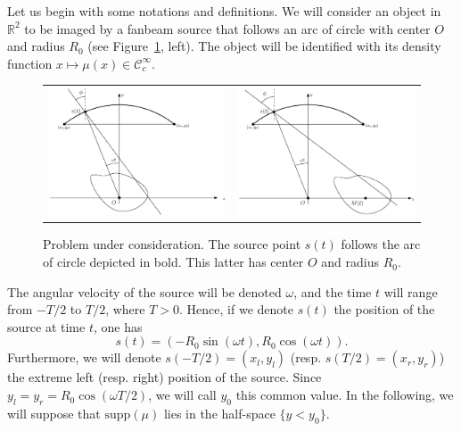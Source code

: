 \documentclass[a4paper]{article}
\numberwithin{equation}{section}
\newcommand{\R}{\mathbb{R}}
\newcommand{\Ccinf}{\mathcal{C}_c^{\infty}}
\newcommand{\supp}{\textrm{supp}}
\begin{document}
Let us begin with some notations and definitions. We will consider an object in $\R^2$ to be imaged by a fanbeam source that follows an arc of circle with center $O$ and radius $R_0$ (see Figure~\ref{fig:notations}, left). The object will be identified with its density function $x \mapsto \mu(x) \in \Ccinf$.
\begin{figure}[!ht]
	\centering
	\begin{tabular}{cc}
	\includegraphics[width=8cm]{figs/frame_scanner_still.eps} &
	\includegraphics[width=8cm]{figs/frame_scanner.eps}
	\end{tabular}
	\caption{Problem under consideration. The source point $s(t)$ follows the arc of circle depicted in bold. This latter has center $O$ and radius $R_0$.\label{fig:notations}}
\end{figure}
The angular velocity of the source will be denoted $\omega$, and the time $t$ will range from $-T/2$ to $T/2$, where $T>0$. Hence, if we denote $s(t)$ the position of the source at time $t$, one has
\begin{equation}
	s(t) = \left( -R_0 \sin(\omega t), R_0 \cos(\omega t) \right).
\label{eq:source_position}
\end{equation}
Furthermore, we will denote $s(-T/2)=(x_l,y_l)$ (resp. $s(T/2)=(x_r,y_r)$) the extreme left (resp. right) position of the source. Since $y_l = y_r = R_0 \cos(\omega T/2)$, we will call $y_0$ this common value. In the following, we will suppose that $\supp(\mu)$ lies in the half-space $\{ y < y_0 \}$.
\end{document}
